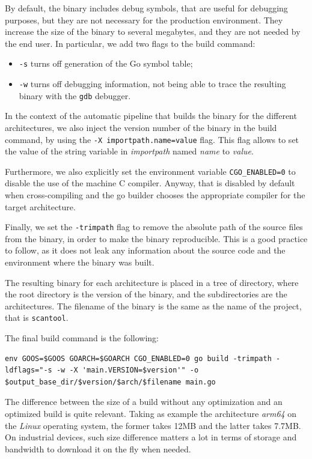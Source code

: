 By default, the binary includes debug symbols, that are useful for debugging purposes, but they are not necessary for the production environment. They increase the size of the binary to several megabytes, and they are not needed by the end user. In particular, we add two flags to the build command:~\cite{go-ldflags-all,go-ldflags-s-w}
\begin{itemize}
  \item \texttt{-s} turns off generation of the Go symbol table;
  \item \texttt{-w} turns off debugging information, not being able to trace the resulting binary with the \texttt{gdb} debugger.
\end{itemize}

In the context of the automatic pipeline that builds the binary for the different architectures, we also inject the version number of the binary in the build command, by using the \texttt{-X importpath.name=value} flag. This flag allows to set the value of the string variable in \textit{importpath} named \textit{name} to \textit{value}.~\cite{go-ldflags-all}

Furthermore, we also explicitly set the environment variable \texttt{CGO\_ENABLED=0} to disable the use of the machine C compiler. Anyway, that is disabled by default when cross-compiling and the go builder chooses the appropriate compiler for the target architecture.~\cite{go-cgo-compiler}

Finally, we set the \texttt{-trimpath} flag to remove the absolute path of the source files from the binary, in order to make the binary reproducible. This is a good practice to follow, as it does not leak any information about the source code and the environment where the binary was built.~\cite{go-trimpath-arg}

The resulting binary for each architecture is placed in a tree of directory, where the root directory is the version of the binary, and the subdirectories are the architectures. The filename of the binary is the same as the name of the project, that is \texttt{scantool}.

The final build command is the following:
\begin{lstlisting}[caption={Go tool cross-build command}]
  env GOOS=$GOOS GOARCH=$GOARCH CGO_ENABLED=0 go build -trimpath -ldflags="-s -w -X 'main.VERSION=$version'" -o $output_base_dir/$version/$arch/$filename main.go
\end{lstlisting}

The difference between the size of a build without any optimization and an optimized build is quite relevant. Taking as example the architecture \textit{arm64} on the \textit{Linux} operating system, the former takes 12MB and the latter takes 7.7MB. On industrial devices, such size difference matters a lot in terms of storage and bandwidth to download it on the fly when needed.

